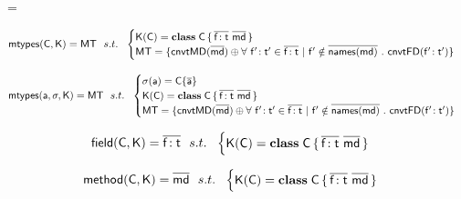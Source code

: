 \documentclass[a4paper,UKenglish,final]{lipics}
\begin{document}
\hrulefill


\mtype\m\C\K = \convert{\methz\m\C\K} 

\hrulefill


\begin{equation*}
\classoff\C\K = \Mxt{MT} ~~s.t.~~ \begin{cases}

 \K(\C) = \Class \C {\b{\Ftype\f\t}}{\b\md} \\
 \Mxt{MT} = \{\convert{\b\md} \oplus \forall ~\Ftype\fp\tp \in \b{\Ftype\f\t} ~|~ \fp \notin \b{\names{\md}} ~.~ \convertFD{\Ftype\fp\tp}\}

\end{cases}
\end{equation*}

\hrulefill



\begin{equation*}
\classoffs\a\s\K = \Mxt{MT} ~~s.t.~~ \begin{cases}

 \s(\a) = \obj\C{\b\a} \\
 \K(\C) = \Class \C {\b{\Ftype\f\t}}{\b\md} \\
 \Mxt{MT} = \{\convert{\b\md} \oplus \forall ~\Ftype\fp\tp \in \b{\Ftype\f\t} ~|~ \fp \notin \b{\names{\md}} ~.~ \convertFD{\Ftype\fp\tp}\}

\end{cases}
\end{equation*}

\hrulefill


\begin{equation*}
\field\C\K = \b{\Ftype\f\t} ~~s.t.~~ \begin{cases}

 \K(\C) = \Class \C {\b{\Ftype\f\t}}{\b\md}
\end{cases}
\end{equation*}

\hrulefill


\begin{equation*}
\method\C\K = \b\md ~~s.t.~~ \begin{cases}

 \K(\C) = \Class \C {\b{\Ftype\f\t}}{\b\md}\\
\end{cases}
\end{equation*}
\end{document}
